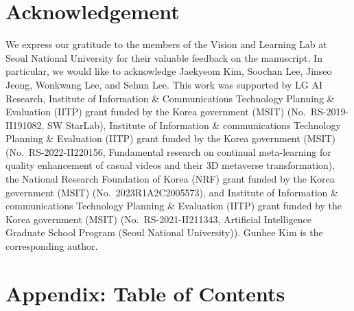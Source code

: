 \documentclass{article}
\theoremstyle{plain}
\theoremstyle{definition}
\theoremstyle{remark}
\begin{document}
\section*{Acknowledgement}
We express our gratitude to the members of the Vision and Learning Lab at Seoul National University for their valuable feedback on the manuscript.
In particular, we would like to acknowledge Jaekyeom Kim, Soochan Lee, Jinseo Jeong, Wonkwang Lee, and Sehun Lee.
This work was supported by 
LG AI Research,
Institute of Information \& Communications Technology Planning \& Evaluation (IITP) grant funded by the Korea government (MSIT) (No.~RS-2019-II191082, SW StarLab), %
Institute of Information \& communications Technology Planning \& Evaluation (IITP) grant funded by the Korea government (MSIT) (No.~RS-2022-II220156, Fundamental research on continual meta-learning for quality enhancement of casual videos and their 3D metaverse transformation), %
the National Research Foundation of Korea (NRF) grant funded by the Korea government (MSIT) (No.~2023R1A2C2005573), %
and Institute of Information \& communications Technology Planning \& Evaluation (IITP) grant funded by the Korea government (MSIT) (No.~RS-2021-II211343, Artificial Intelligence Graduate School Program (Seoul National University)).  %
Gunhee Kim is the corresponding author.







\newpage
\appendix

\section{Appendix: Table of Contents}
\end{document}
